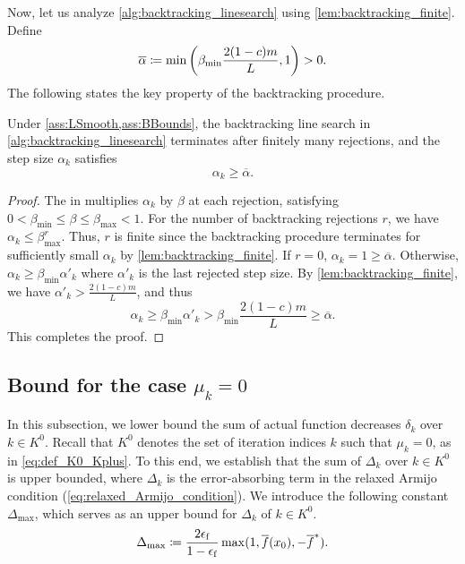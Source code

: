 \documentclass[journal]{subfiles}
\begin{document}
Now, let us analyze \cref{alg:backtracking_linesearch} using \cref{lem:backtracking_finite}.
Define
\begin{equation*}
    \overline{\alpha}\coloneqq \min\qty(\beta_{\min} \frac{2(1-c)m}{L},1)>0.
\end{equation*}
The following states the key property of the backtracking procedure.

\begin{proposition}\label{prop:backtracking_summary}
    Under \cref{ass:LSmooth,ass:BBounds}, the backtracking line search in \cref{alg:backtracking_linesearch} terminates after finitely many rejections, and the step size $\alpha_k$ satisfies
    \begin{equation*}
        \alpha_k\ge\overline{\alpha}.
    \end{equation*}
\end{proposition}
\begin{proof}
    The  in  multiplies $\alpha_k$ by $\beta$ at each rejection, satisfying $0<\beta_{\min} \le \beta \leq \beta_{\max}<1$.
    For the number of backtracking rejections $r$, we have $\alpha_k\le\beta_{\max}^r$.
    Thus, $r$ is finite since the backtracking procedure terminates for sufficiently small $\alpha_k$ by \cref{lem:backtracking_finite}.
    If $r=0$, $\alpha_k=1\ge\overline{\alpha}$.
    Otherwise, $\alpha_k \geq \beta_{\min} \alpha'_k$ where $\alpha'_k$ is the last rejected step size. By \cref{lem:backtracking_finite}, we have $\alpha'_k > \frac{2(1-c)m}{L}$, and thus
    \begin{equation*}
        \alpha_k \ge \beta_{\min}\alpha'_k > \beta_{\min} \frac{2(1-c)m}{L} \geq \overline{\alpha}.
    \end{equation*}
    This completes the proof.
    \myQED
\end{proof}

\subsection{Bound for the case \texorpdfstring{$\mu_k=0$}{mu k = 0}}

In this subsection, we lower bound the sum of actual function decreases $\delta_k$ over $k \in K^0$.
Recall that $K^0$ denotes the set of iteration indices $k$ such that $\mu_k = 0$, as in \cref{eq:def_K0_Kplus}.
To this end, we establish that the sum of $\Delta_k$ over $k \in K^0$ is upper bounded, where $\Delta_k$ is the error-absorbing term in the relaxed Armijo condition (\cref{eq:relaxed_Armijo_condition}).
We introduce the following constant $\Delta_{\max}$, which serves as an upper bound for $\Delta_k$ of $k \in K^0$.
\begin{equation*}
    \Delta_{\max} \coloneqq \frac{2\epsilon_\mathrm{f}}{1-\epsilon_\mathrm{f}} \max(1, \overline{f}(x_{0}), -\overline{f}^*).
\end{equation*}
\end{document}
